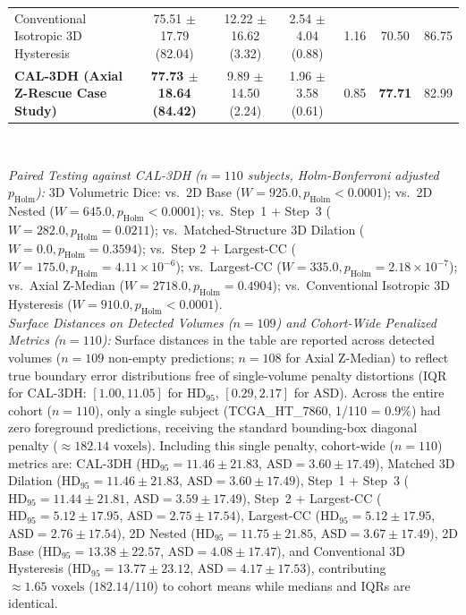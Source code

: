 \documentclass[11pt,a4paper]{article}
\begin{document}
\begin{table}[tbp]
{\begin{tabular}{lcccccc}
Conventional Isotropic 3D Hysteresis & 75.51 $\pm$ 17.79 (82.04) & 12.22 $\pm$ 16.62 (3.32) & 2.54 $\pm$ 4.04 (0.88) & 1.16 & 70.50 & 86.75 \\
\textbf{CAL-3DH (Axial Z-Rescue Case Study)} & \textbf{77.73 $\pm$ 18.64 (84.42)} & 9.89 $\pm$ 14.50 (2.24) & 1.96 $\pm$ 3.58 (0.61) & 0.85 & \textbf{77.71} & 82.99 \\
\bottomrule
\end{tabular}%
}
\\[4pt]
\begin{minipage}{\textwidth}
\scriptsize
\textit{Paired Testing against CAL-3DH ($n=110$ subjects, Holm-Bonferroni adjusted $p_{\text{Holm}}$):}
3D Volumetric Dice: vs.\ 2D Base ($W=925.0, p_{\text{Holm}} < 0.0001$); vs.\ 2D Nested ($W=645.0, p_{\text{Holm}} < 0.0001$); vs.\ Step~1 + Step~3 ($W=282.0, p_{\text{Holm}} = 0.0211$); vs.\ Matched-Structure 3D Dilation ($W=0.0, p_{\text{Holm}} = 0.3594$); vs.\ Step 2 + Largest-CC ($W=175.0, p_{\text{Holm}} = 4.11 \times 10^{-6}$); vs.\ Largest-CC ($W=335.0, p_{\text{Holm}} = 2.18 \times 10^{-7}$); vs.\ Axial Z-Median ($W=2718.0, p_{\text{Holm}} = 0.4904$); vs.\ Conventional Isotropic 3D Hysteresis ($W=910.0, p_{\text{Holm}} < 0.0001$).\\
\textit{Surface Distances on Detected Volumes ($n=109$) and Cohort-Wide Penalized Metrics ($n=110$):} Surface distances in the table are reported across detected volumes ($n=109$ non-empty predictions; $n=108$ for Axial Z-Median) to reflect true boundary error distributions free of single-volume penalty distortions (IQR for CAL-3DH: $[1.00, 11.05]$ for $\text{HD}_{95}$, $[0.29, 2.17]$ for ASD). Across the entire cohort ($n=110$), only a single subject (TCGA\_HT\_7860, 1/110 = $0.9\%$) had zero foreground predictions, receiving the standard bounding-box diagonal penalty ($\approx 182.14\text{ voxels}$). Including this single penalty, cohort-wide ($n=110$) metrics are: CAL-3DH ($\text{HD}_{95} = 11.46 \pm 21.83$, $\text{ASD} = 3.60 \pm 17.49$), Matched 3D Dilation ($\text{HD}_{95} = 11.46 \pm 21.83$, $\text{ASD} = 3.60 \pm 17.49$), Step~1 + Step~3 ($\text{HD}_{95} = 11.44 \pm 21.81$, $\text{ASD} = 3.59 \pm 17.49$), Step~2 + Largest-CC ($\text{HD}_{95} = 5.12 \pm 17.95$, $\text{ASD} = 2.75 \pm 17.54$), Largest-CC ($\text{HD}_{95} = 5.12 \pm 17.95$, $\text{ASD} = 2.76 \pm 17.54$), 2D Nested ($\text{HD}_{95} = 11.75 \pm 21.85$, $\text{ASD} = 3.67 \pm 17.49$), 2D Base ($\text{HD}_{95} = 13.38 \pm 22.57$, $\text{ASD} = 4.08 \pm 17.47$), and Conventional 3D Hysteresis ($\text{HD}_{95} = 13.77 \pm 23.12$, $\text{ASD} = 4.17 \pm 17.53$), contributing $\approx 1.65\text{ voxels}$ ($182.14 / 110$) to cohort means while medians and IQRs are identical.\\

\end{minipage}
\end{table}
\end{document}
